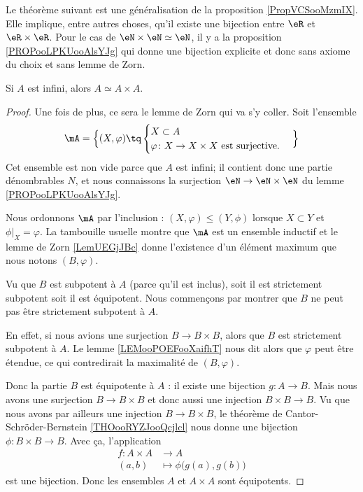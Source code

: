 Le théorème suivant est une généralisation de la proposition \ref{PropVCSooMzmIX}. Elle implique, entre autres choses, qu'il existe une bijection entre \( \eR\) et \( \eR\times \eR\). Pour le cas de \( \eN\times \eN\simeq \eN\), il y a la proposition \ref{PROPooLPKUooAlsYJg} qui donne une bijection explicite et donc sans axiome du choix et sans lemme de Zorn.
\begin{theorem}     \label{THOooDGOVooRdURVi}
    Si \( A\) est infini, alors \( A\simeq A\times A\).
\end{theorem}

\begin{proof}
    Une fois de plus, ce sera le lemme de Zorn qui va s'y coller. Soit l'ensemble
    \begin{equation}
       \mA=\Big\{  (X,\varphi)  \tq
        \begin{cases}
            X\subset A\\
            \varphi\colon X\to X\times X\text{ est surjective.}
        \end{cases}
    \Big\}
    \end{equation}
    Cet ensemble est non vide parce que \( A\) est infini; il contient donc une partie dénombrables \( N\), et nous connaissons la surjection \( \eN\to \eN\times \eN\) du lemme \ref{PROPooLPKUooAlsYJg}.

    Nous ordonnons \( \mA\) par l'inclusion : \( (X,\varphi)\leq (Y,\phi)\) lorsque \( X\subset Y\) et \( \phi|_X=\varphi\). La tambouille usuelle montre que \( \mA\) est un ensemble inductif et le lemme de Zorn \ref{LemUEGjJBc} donne l'existence d'un élément maximum que nous notons \( (B,\varphi)\).

    Vu que \( B\) est subpotent à \( A\) (parce qu'il est inclus), soit il est strictement subpotent soit il est équipotent. Nous commençons par montrer que \( B\) ne peut pas être strictement subpotent à \( A\).

    En effet, si nous avions une surjection \( B\to B\times B\), alors que \( B\) est strictement subpotent à \( A\). Le lemme \ref{LEMooPOEFooXaifhT} nous dit alors que \( \varphi\) peut être étendue, ce qui contredirait la maximalité de \( (B,\varphi)\).

    Donc la partie \( B\) est équipotente à \( A\) : il existe une bijection \( g\colon A\to B\). Mais nous avons une surjection \( B\to B\times B\) et donc aussi une injection \( B\times B\to B\). Vu que nous avons par ailleurs une injection \( B\to B\times B\), le théorème de Cantor-Schröder-Bernstein \ref{THOooRYZJooQcjlcl} nous donne une bijection \( \phi\colon B\times B\to B\). Avec ça, l'application
    \begin{equation}
        \begin{aligned}
            f\colon A\times A&\to A \\
            (a,b)&\mapsto \phi\big( g(a),g(b) \big) 
        \end{aligned}
    \end{equation}
    est une bijection. Donc les ensembles \( A\) et \( A\times A\) sont équipotents.
\end{proof}

